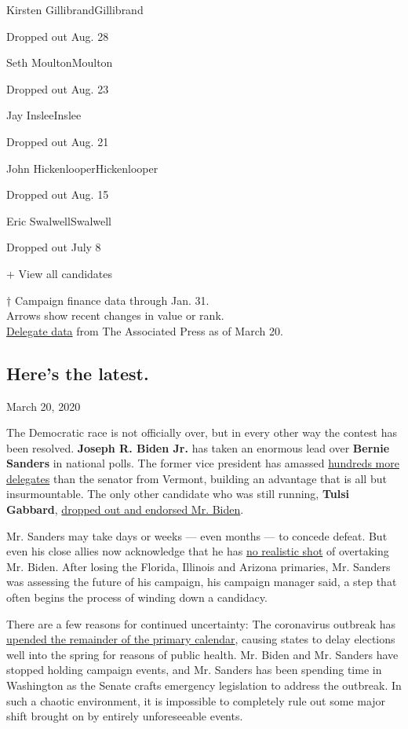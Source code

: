 Kirsten GillibrandGillibrand

Dropped out Aug. 28

Seth MoultonMoulton

Dropped out Aug. 23

Jay InsleeInslee

Dropped out Aug. 21

John HickenlooperHickenlooper

Dropped out Aug. 15

Eric SwalwellSwalwell

Dropped out July 8

+ View all candidates

† Campaign finance data through Jan. 31.\\
Arrows show recent changes in value or rank.\\
\href{https://www.nytimes.com/interactive/2020/us/elections/delegate-count-primary-results.html}{Delegate
data} from The Associated Press as of March 20.

\hypertarget{heres-the-latest}{%
\subsection{Here's the latest.}\label{heres-the-latest}}

March 20, 2020

The Democratic race is not officially over, but in every other way the
contest has been resolved. \textbf{Joseph R. Biden Jr.} has taken an
enormous lead over \textbf{Bernie Sanders} in national polls. The former
vice president has amassed
\href{https://www.nytimes.com/interactive/2020/us/elections/delegate-count-primary-results.html}{hundreds
more delegates} than the senator from Vermont, building an advantage
that is all but insurmountable. The only other candidate who was still
running, \textbf{Tulsi Gabbard},
\href{https://www.nytimes.com/2020/03/19/us/politics/tulsi-gabbard-drops-out.html}{dropped
out and endorsed Mr. Biden}.

Mr. Sanders may take days or weeks --- even months --- to concede
defeat. But even his close allies now acknowledge that he has
\href{https://www.nytimes.com/2020/03/18/us/politics/bernie-sanders-campaign.html}{no
realistic shot} of overtaking Mr. Biden. After losing the Florida,
Illinois and Arizona primaries, Mr. Sanders was assessing the future of
his campaign, his campaign manager said, a step that often begins the
process of winding down a candidacy.

There are a few reasons for continued uncertainty: The coronavirus
outbreak has
\href{https://www.nytimes.com/article/2020-campaign-primary-calendar-coronavirus.html}{upended
the remainder of the primary calendar}, causing states to delay
elections well into the spring for reasons of public health. Mr. Biden
and Mr. Sanders have stopped holding campaign events, and Mr. Sanders
has been spending time in Washington as the Senate crafts emergency
legislation to address the outbreak. In such a chaotic environment, it
is impossible to completely rule out some major shift brought on by
entirely unforeseeable events.

